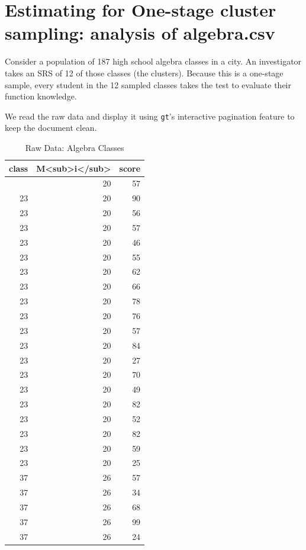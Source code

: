 \documentclass[
  letterpaper,
  DIV=11,
  numbers=noendperiod]{scrreprt}
\renewcommand{\[}{\begin{equation}}
\renewcommand{\]}{\end{equation}}
\begin{document}
\section{Estimating for One-stage cluster sampling: analysis of
algebra.csv}\label{estimating-for-one-stage-cluster-sampling-analysis-of-algebra.csv}

Consider a population of 187 high school algebra classes in a city. An
investigator takes an SRS of 12 of those classes (the clusters). Because
this is a one-stage sample, every student in the 12 sampled classes
takes the test to evaluate their function knowledge.

We read the raw data and display it using \texttt{gt}'s interactive
pagination feature to keep the document clean.

\begin{table}
\caption*{
{\fontsize{20}{25}\selectfont  Raw Data: Algebra Classes\fontsize{12}{15}\selectfont }
} 
\fontsize{12.0pt}{14.0pt}\selectfont
\begin{tabular*}{\linewidth}{@{\extracolsep{\fill}}rrr}
\toprule
class & M<sub>i</sub> & score \\ 
\midrule\addlinespace[2.5pt]
23 & 20 & 57 \\ 
23 & 20 & 90 \\ 
23 & 20 & 56 \\ 
23 & 20 & 57 \\ 
23 & 20 & 46 \\ 
23 & 20 & 55 \\ 
23 & 20 & 62 \\ 
23 & 20 & 66 \\ 
23 & 20 & 78 \\ 
23 & 20 & 76 \\ 
23 & 20 & 57 \\ 
23 & 20 & 84 \\ 
23 & 20 & 27 \\ 
23 & 20 & 70 \\ 
23 & 20 & 49 \\ 
23 & 20 & 82 \\ 
23 & 20 & 52 \\ 
23 & 20 & 82 \\ 
23 & 20 & 59 \\ 
23 & 20 & 25 \\ 
37 & 26 & 57 \\ 
37 & 26 & 34 \\ 
37 & 26 & 68 \\ 
37 & 26 & 99 \\ 
37 & 26 & 24 \\ 

\end{tabular*}
\end{table}
\end{document}
